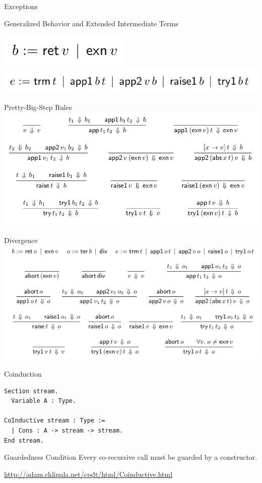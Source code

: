 \documentclass[page number,dvipsnames]{beamer}
\begin{document}
\begin{frame}{Exceptions}
  \begin{block}{Generalized Behavior and Extended Intermediate Terms}
    \begin{center}
    \includegraphics[scale=0.3]{behavior.png}\hfill
    \includegraphics[scale=0.3]{expr_ex.png}
    \end{center}
  \end{block}
  \vfill
  \begin{exampleblock}{Pretty-Big-Step Rules}
    \center
    \includegraphics[scale=0.3]{ex_rules.png}
  \end{exampleblock}
\end{frame}

\begin{frame}{Divergence}
  \center
  \includegraphics[scale=0.3]{div_rules.png}
\end{frame}

\begin{frame}[fragile]{Coinduction}
  \begin{lstlisting}[language=Coq]
Section stream.
  Variable A : Type.

CoInductive stream : Type :=
  | Cons : A -> stream -> stream.
End stream.
  \end{lstlisting}
  \vfill
  \begin{alertblock}{Guardedness Condition}
    Every co-recursive call must be guarded by a constructor.
  \end{alertblock}
  \vfill
  \url{http://adam.chlipala.net/cpdt/html/Coinductive.html}
\end{frame}
\end{document}

